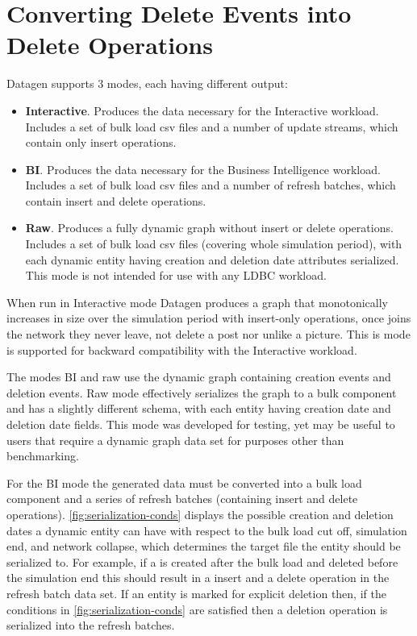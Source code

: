 \section{Converting Delete Events into Delete Operations}
\label{sec:conv-delete-events}
Datagen supports 3 modes, each having different output:
\begin{itemize}
\item \textbf{Interactive}. Produces the data necessary for the Interactive workload. Includes a set of bulk load csv files and a number of update streams, which contain only insert operations.
\item \textbf{BI}. Produces the data necessary for the Business Intelligence workload. Includes a set of bulk load csv files and a number of refresh batches, which contain insert and delete operations.
\item \textbf{Raw}. Produces a fully dynamic graph without insert or delete operations. Includes a set of bulk load csv files (covering whole simulation period), with each dynamic entity having creation and deletion date attributes serialized. This mode is not intended for use with any LDBC workload.
\end{itemize}

When run in Interactive mode Datagen produces a graph that monotonically increases in size over the simulation period with insert-only operations, \eg once \tPerson joins the network they never leave, not delete a post nor unlike a picture.
This is mode is supported for backward compatibility with the Interactive workload.

The modes BI and raw use the dynamic graph containing creation events and deletion events.
Raw mode effectively serializes the graph to a bulk component and has a slightly different schema, with each entity having creation date and deletion date fields.
This mode was developed for testing, yet may be useful to users that require a dynamic graph data set for purposes other than benchmarking.

For the BI mode the generated data must be converted into a bulk load component and a series of refresh batches (containing insert and delete operations).
\autoref{fig:serialization-conds} displays the possible creation and deletion dates a dynamic entity can have with respect to the bulk load cut off, simulation end, and network collapse, which determines the target file the entity should be serialized to.
For example, if a \tPost is created after the bulk load and deleted before the simulation end this should result in a insert and a delete operation in the refresh batch data set.
If an entity is marked for explicit deletion then, if the conditions in \autoref{fig:serialization-conds} are satisfied then a deletion operation is serialized into the refresh batches.


